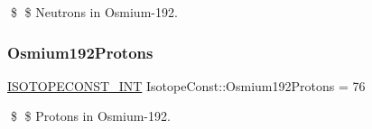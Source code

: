 \$ \$ Neutrons in Osmium-\/192. \mbox{\label{group___isotope_const-_osmium-_os192_ga7fcbd219e6081bbc9d9fb4f604d7ba13}} 
\subsubsection{\texorpdfstring{Osmium192\+Protons}{Osmium192Protons}}
{\footnotesize\ttfamily \mbox{\hyperlink{group___isotope_const-_macros_ga5f18360b3e99483a35c32d789e62621c}{I\+S\+O\+T\+O\+P\+E\+C\+O\+N\+S\+T\+\_\+\+I\+NT}} Isotope\+Const\+::\+Osmium192\+Protons = 76}

\$ \$ Protons in Osmium-\/192. 